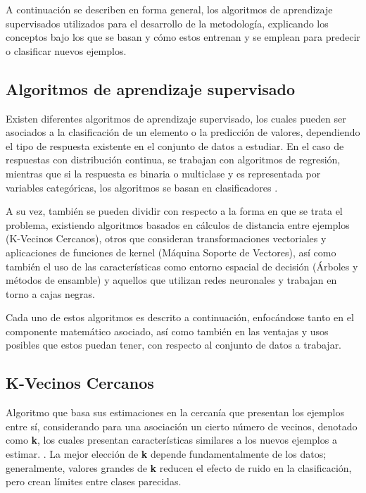 A continuación se describen en forma general, los algoritmos de aprendizaje supervisados utilizados para el desarrollo de la metodología, explicando los conceptos bajo los que se basan y cómo estos entrenan y se emplean para predecir o clasificar nuevos ejemplos.

\subsection{Algoritmos de aprendizaje supervisado}

Existen diferentes algoritmos de aprendizaje supervisado, los cuales pueden ser asociados a la clasificación de un elemento o la predicción de valores, dependiendo el tipo de respuesta existente en el conjunto de datos a estudiar. En el caso de respuestas con distribución continua, se trabajan con algoritmos de regresión, mientras que si la respuesta es binaria o multiclase y es representada por variables categóricas, los algoritmos se basan en clasificadores \cite{michie1994machine}.

A su vez, también se pueden dividir con respecto a la forma en que se trata el problema, existiendo algoritmos basados en cálculos de distancia entre ejemplos (K-Vecinos Cercanos), otros que consideran transformaciones vectoriales y aplicaciones de funciones de kernel (Máquina Soporte de Vectores), así como también el uso de las características como entorno espacial de decisión (Árboles y métodos de ensamble) y aquellos que utilizan redes neuronales y trabajan en torno a cajas negras.

Cada uno de estos algoritmos es descrito a continuación, enfocándose tanto en el componente matemático asociado, así como también en las ventajas y usos posibles que estos puedan tener, con respecto al conjunto de datos a trabajar.

\subsection{K-Vecinos Cercanos}

Algoritmo que basa sus estimaciones en la cercanía que presentan los ejemplos entre sí, considerando para una asociación un cierto número de vecinos, denotado como \textbf{k}, los cuales presentan características similares a los nuevos ejemplos a estimar. \cite{6313426}. La mejor elección de \textbf{k} depende fundamentalmente de los datos; generalmente, valores grandes de \textbf{k} reducen el efecto de ruido en la clasificación, pero crean límites entre clases parecidas.

